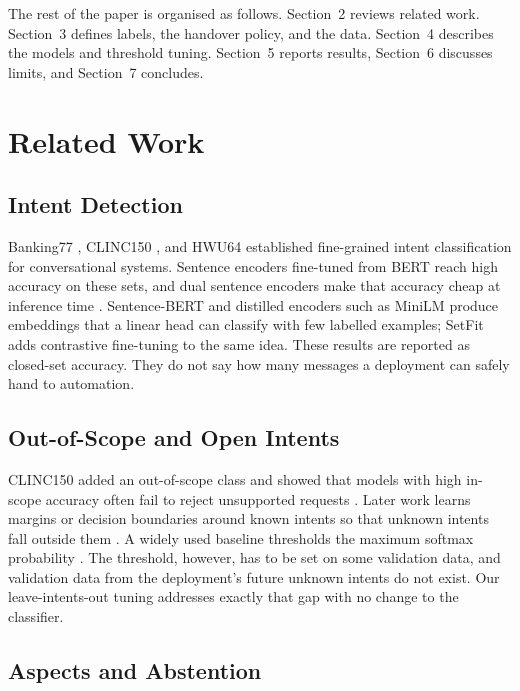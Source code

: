 \documentclass{icaiit2027}
\begin{document}
The rest of the paper is organised as follows. Section~2 reviews related work. Section~3 defines labels, the handover policy, and the data. Section~4 describes the models and threshold tuning. Section~5 reports results, Section~6 discusses limits, and Section~7 concludes.

\section{Related Work}

\subsection{Intent Detection}

Banking77 \cite{casanueva2020}, CLINC150 \cite{larson2019}, and HWU64 \cite{liu2021} established fine-grained intent classification for conversational systems. Sentence encoders fine-tuned from BERT \cite{devlin2019} reach high accuracy on these sets, and dual sentence encoders make that accuracy cheap at inference time \cite{casanueva2020}. Sentence-BERT \cite{reimers2019} and distilled encoders such as MiniLM \cite{wang2020} produce embeddings that a linear head can classify with few labelled examples; SetFit \cite{tunstall2022} adds contrastive fine-tuning to the same idea. These results are reported as closed-set accuracy. They do not say how many messages a deployment can safely hand to automation.

\subsection{Out-of-Scope and Open Intents}

CLINC150 added an out-of-scope class and showed that models with high in-scope accuracy often fail to reject unsupported requests \cite{larson2019}. Later work learns margins or decision boundaries around known intents so that unknown intents fall outside them \cite{lin2019,zhang2021}. A widely used baseline thresholds the maximum softmax probability \cite{hendrycks2017}. The threshold, however, has to be set on some validation data, and validation data from the deployment's future unknown intents do not exist. Our leave-intents-out tuning addresses exactly that gap with no change to the classifier.

\subsection{Aspects and Abstention}
\end{document}
